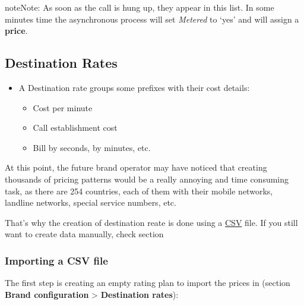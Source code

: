 \documentclass[letterpaper,10pt,english]{sphinxmanual}
\begin{document}
\begin{notice}{note}{Note:}
As soon as the call is hung up, they appear in this list. In some minutes
time the asynchronous process will set \emph{Metered} to `yes' and will assign a
\textbf{price}.
\end{notice}


\subsection{Destination Rates}
\label{brand/billing/destination_rates:destination-rates}\label{brand/billing/destination_rates::doc}\label{brand/billing/destination_rates:destination-rate}\begin{itemize}
\item {} 
A Destination rate groups some prefixes with their cost details:
\begin{itemize}
\item {} 
Cost per minute

\item {} 
Call establishment cost

\item {} 
Bill by seconds, by minutes, etc.

\end{itemize}

\end{itemize}

At this point, the future brand operator may have noticed that creating thousands
of pricing patterns would be a really annoying and time consuming task, as there
are 254 countries, each of them with their mobile networks, landline networks,
special service numbers, etc.

That's why the creation of destination reate is done using a
\href{https://es.wikipedia.org/wiki/CSV}{CSV} file. If you still want to create data
manually, check section {\hyperref[getting_started/external_outgoing_calls/destination_rate:creating\string-a\string-destination\string-rate]{}}


\subsubsection{Importing a CSV file}
\label{brand/billing/destination_rates:importing-a-csv-file}
The first step is creating an empty rating plan to import the prices in (section
\textbf{Brand configuration} \textgreater{} \textbf{Destination rates}):
\end{document}
